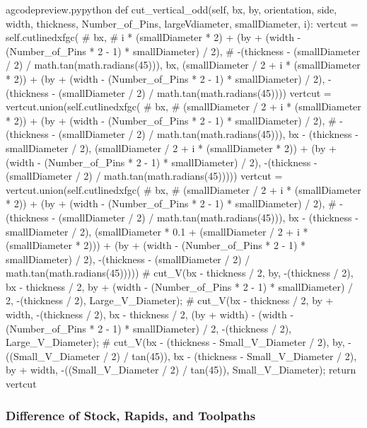 \documentclass{ltxdoc}
\begin{document}
\begin{writecode}{a}{gcodepreview.py}{python}
    def cut_vertical_odd(self, bx, by, orientation, side, width, thickness, Number_of_Pins, largeVdiameter, smallDiameter, i):
        vertcut = self.cutlinedxfgc(
#            bx, 
#            i * (smallDiameter * 2) + (by + (width - (Number_of_Pins * 2 - 1) * smallDiameter) / 2), 
#            -(thickness - (smallDiameter / 2) / math.tan(math.radians(45))), 
            bx, 
            (smallDiameter / 2 + i * (smallDiameter * 2)) + (by + (width - (Number_of_Pins * 2 - 1) * smallDiameter) / 2), 
            -(thickness - (smallDiameter / 2) / math.tan(math.radians(45))))
        vertcut = vertcut.union(self.cutlinedxfgc(
#            bx, 
#            (smallDiameter / 2 + i * (smallDiameter * 2)) + (by + (width - (Number_of_Pins * 2 - 1) * smallDiameter) / 2), 
#            -(thickness - (smallDiameter / 2) / math.tan(math.radians(45))), 
            bx - (thickness - smallDiameter / 2), 
            (smallDiameter / 2 + i * (smallDiameter * 2)) + (by + (width - (Number_of_Pins * 2 - 1) * smallDiameter) / 2), 
            -(thickness - (smallDiameter / 2) / math.tan(math.radians(45)))))
        vertcut = vertcut.union(self.cutlinedxfgc(
#            bx, 
#            (smallDiameter / 2 + i * (smallDiameter * 2)) + (by + (width - (Number_of_Pins * 2 - 1) * smallDiameter) / 2), 
#            -(thickness - (smallDiameter / 2) / math.tan(math.radians(45))), 
            bx - (thickness - smallDiameter / 2), 
            (smallDiameter * 0.1 + (smallDiameter / 2 + i * (smallDiameter * 2))) + (by + (width - (Number_of_Pins * 2 - 1) * smallDiameter) / 2), 
            -(thickness - (smallDiameter / 2) / math.tan(math.radians(45)))))
#    cut_V(bx - thickness / 2, by, -(thickness / 2), bx - thickness / 2, by + (width - (Number_of_Pins * 2 - 1) * smallDiameter) / 2, -(thickness / 2), Large_V_Diameter);
#    cut_V(bx - thickness / 2, by + width, -(thickness / 2), bx - thickness / 2, (by + width) - (width - (Number_of_Pins * 2 - 1) * smallDiameter) / 2, -(thickness / 2), Large_V_Diameter);
#    cut_V(bx - (thickness - Small_V_Diameter / 2), by, -((Small_V_Diameter / 2) / tan(45)), bx - (thickness - Small_V_Diameter / 2), by + width, -((Small_V_Diameter / 2) / tan(45)), Small_V_Diameter);
        return vertcut

\end{writecode}
\addtocounter{gcpy}{169}

\subsubsection{Difference of Stock, Rapids, and Toolpaths}
\end{document}
